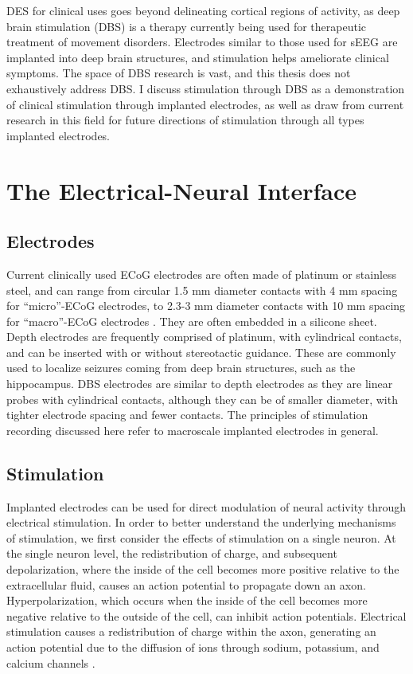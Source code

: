 DES for clinical uses goes beyond delineating cortical regions of activity, as deep brain stimulation (DBS) is a therapy currently being used for therapeutic treatment of movement disorders. Electrodes similar to those used for sEEG are implanted into deep brain structures, and stimulation helps ameliorate clinical symptoms. The space of DBS research is vast, and this thesis does not exhaustively address DBS. I discuss stimulation through DBS as a demonstration of clinical stimulation through implanted electrodes, as well as draw from current research in this field for future directions of stimulation through all types implanted electrodes. 


\section{The Electrical-Neural Interface}

\subsection{Electrodes}

Current clinically used ECoG electrodes are often made of platinum or stainless steel, and can range from circular 1.5 mm diameter contacts with 4 mm spacing for “micro”-ECoG electrodes, to 2.3-3 mm diameter contacts with 10 mm spacing for “macro”-ECoG electrodes \cite{Chang2015a}. They are often embedded in a silicone sheet. Depth electrodes are frequently comprised of platinum, with cylindrical contacts, and can be inserted with or without stereotactic guidance. These are commonly used to localize seizures coming from deep brain structures, such as the hippocampus. DBS electrodes are similar to depth electrodes as they are linear probes with cylindrical contacts, although they can be of smaller diameter, with tighter electrode spacing and fewer contacts. The principles of stimulation recording discussed here refer to macroscale implanted electrodes in general. 

\subsection{Stimulation}

Implanted electrodes can be used for direct modulation of neural activity through electrical stimulation. In order to better understand the underlying mechanisms of stimulation, we first consider the effects of stimulation on a single neuron. At the single neuron level, the redistribution of charge, and subsequent depolarization, where the inside of the cell becomes more positive relative to the extracellular fluid, causes an action potential to propagate down an axon. Hyperpolarization, which occurs when the inside of the cell becomes more negative relative to the outside of the cell, can inhibit action potentials. Electrical stimulation causes a redistribution of charge within the axon, generating an action potential due to the diffusion of ions through sodium, potassium, and calcium channels  \cite{Bean2007}. 

